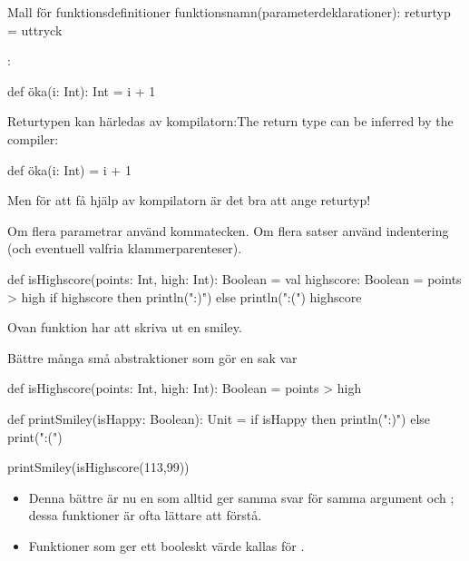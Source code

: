 \begin{Slide}{Mall för funktionsdefinitioner}
 funktionsnamn(parameterdeklarationer): returtyp = uttryck

\pause\vspace{0.3em}\SlideFontSmall
{}:

\begin{Code}[basicstyle=\ttfamily\fontsize{9}{11}\selectfont]
def öka(i: Int): Int = i + 1
\end{Code}
\pause \ifswedish Returtypen kan härledas av kompilatorn:\else The return type can be inferred by the compiler:\fi
\begin{Code}[basicstyle=\ttfamily\fontsize{9}{11}\selectfont]
def öka(i: Int) = i + 1
\end{Code}
Men för att få hjälp av kompilatorn är det bra att ange returtyp!

\pause 

Om flera parametrar använd kommatecken. Om flera satser använd indentering (och eventuell valfria klammerparenteser).
\begin{Code}[basicstyle=\ttfamily\fontsize{8}{10}\selectfont]
def isHighscore(points: Int, high: Int): Boolean = {
  val highscore: Boolean = points > high
  if highscore then println(":)") else println(":(")
  highscore
}
\end{Code}
\pause Ovan funktion har  att skriva ut en smiley.
\end{Slide}

\begin{Slide}{Bättre många små abstraktioner som gör en sak var}

\begin{Code}[basicstyle=\ttfamily\fontsize{8}{11}\selectfont]
def isHighscore(points: Int, high: Int): Boolean = points > high

def printSmiley(isHappy: Boolean): Unit =
  if isHappy then println(":)") else print(":(")
\end{Code}

\pause\vspace{1em}
\begin{REPLnonum}
  printSmiley(isHighscore(113,99))
\end{REPLnonum}

\pause
\begin{itemize}
  \item Denna bättre  är nu en  som alltid ger samma svar för samma argument och ; dessa funktioner är ofta lättare att förstå.
  \item Funktioner som ger ett booleskt värde kallas för .
\end{itemize}

\end{Slide}



